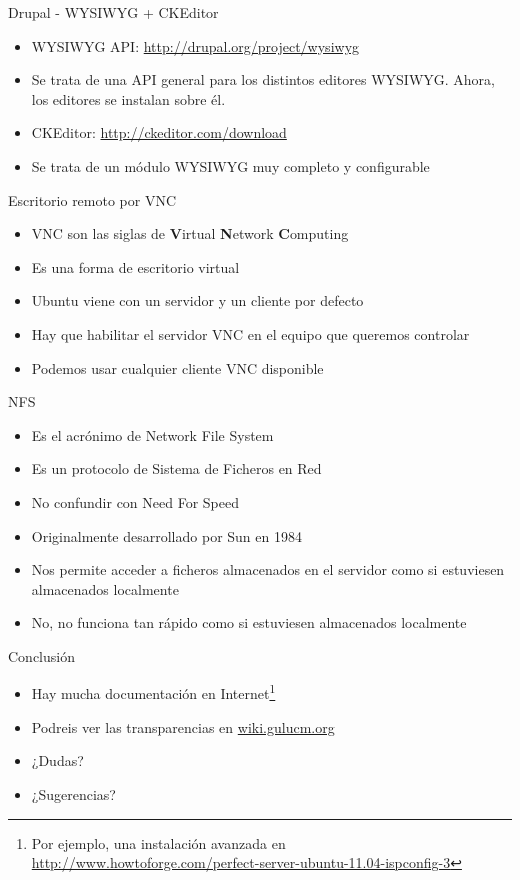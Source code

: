 \documentclass[spanish]{beamer}
\begin{document}
\begin{frame}{Drupal - WYSIWYG + CKEditor}
\begin{itemize}
\item WYSIWYG API: \url{http://drupal.org/project/wysiwyg}
\item Se trata de una API general para los distintos editores WYSIWYG. Ahora, los editores se instalan sobre él.
\item CKEditor:  \url{http://ckeditor.com/download}
\item Se trata de un módulo WYSIWYG muy completo y configurable
\end{itemize}
\end{frame}

\begin{frame}{Escritorio remoto por VNC}
\begin{itemize}
\item VNC son las siglas de {\bf V}irtual {\bf N}etwork {\bf C}omputing
\item Es una forma de escritorio virtual
\item Ubuntu viene con un servidor y un cliente por defecto
\item Hay que habilitar el servidor VNC en el equipo que queremos controlar
\item Podemos usar cualquier cliente VNC disponible
\end{itemize}
\end{frame}

\begin{frame}{NFS}
\begin{itemize}
\item Es el acrónimo de Network File System
\item Es un protocolo de Sistema de Ficheros en Red 
\item No confundir con Need For Speed
\item Originalmente desarrollado por Sun en 1984
\item Nos permite acceder a ficheros almacenados en el servidor como si 
estuviesen almacenados localmente
\item No, no funciona tan rápido como si estuviesen almacenados localmente
\end{itemize}
\end{frame}

\begin{frame}{Conclusión}
\begin{itemize}
\item Hay mucha documentación en Internet\footnote{Por ejemplo, una instalación avanzada en \url{http://www.howtoforge.com/perfect-server-ubuntu-11.04-ispconfig-3}}
\item Podreis ver las transparencias en \url{wiki.gulucm.org}
\item ¿Dudas?
\item ¿Sugerencias?
\end{itemize}
\end{frame}
\end{document}
